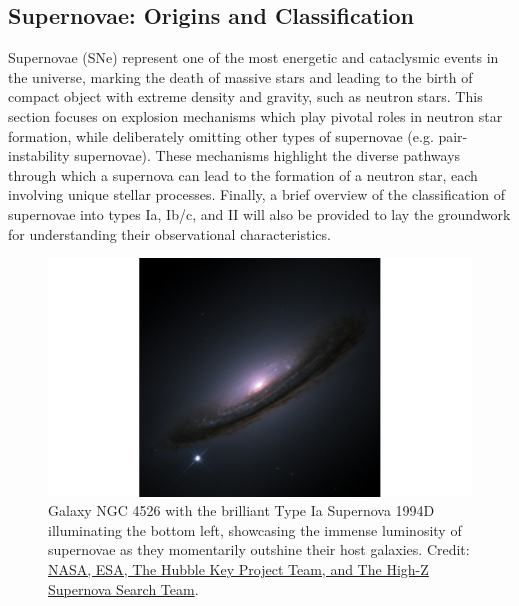 \documentclass[main.tex]{subfiles}
\begin{document}
    \subsection{Supernovae: Origins and Classification}\label{sec:ch1:transients}
    Supernovae (SNe) represent one of the most energetic and cataclysmic events in the universe, marking the death of massive stars and leading to the birth of compact object with extreme density and gravity, such as neutron stars. This section focuses on explosion mechanisms which play pivotal roles in neutron star formation, while deliberately omitting other types of supernovae (e.g. pair-instability supernovae). These mechanisms highlight the diverse pathways through which a supernova can lead to the formation of a neutron star, each involving unique stellar processes. Finally, a brief overview of the classification of supernovae into types Ia, Ib/c, and II will also be provided to lay the groundwork for understanding their observational characteristics.
    \begin{figure}[t]
        \centering
        \includegraphics[scale=0.2]{figures/chapter1/SN1994D_NGC4526.png}
        \caption{Galaxy NGC 4526 with the brilliant Type Ia Supernova 1994D illuminating the bottom left, showcasing the immense luminosity of supernovae as they momentarily outshine their host galaxies. Credit: \href{https://hubblesite.org/contents/media/images/1999/19/813-Image.html}{NASA, ESA, The Hubble Key Project Team, and The High-Z Supernova Search Team}.}
        \label{fig:sn1994d}
    \end{figure}
\end{document}
